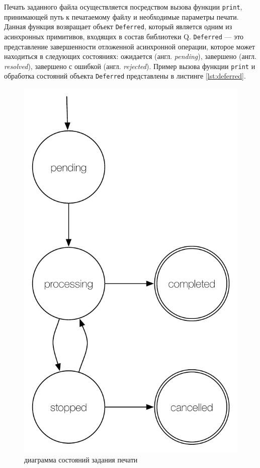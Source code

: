 \documentclass[a4paper,14pt,href,draft]{article}
\begin{document}
Печать заданного файла осуществляется посредством вызова функции \texttt{print}, принимающей путь к печатаемому файлу и
необходимые параметры печати. Данная функция возвращает объект \texttt{Deferred}, который является одним из асинхронных
примитивов, входящих в состав библиотеки Q\cite{QLibrary}. \texttt{Deferred} --- это представление завершенности отложенной
асинхронной операции, которое может находиться в следующих состояниях: ожидается (англ. \textit{pending}),
завершено (англ. \textit{resolved}), завершено с ошибкой (англ. \textit{rejected}). Пример вызова функции \texttt{print}
и обработка состояний объекта \texttt{Deferred} представлены в листинге \ref{lst:deferred}.

\begin{figure}[htbp]
\begin{center}
  \includegraphics[scale=0.65]{state-machine.pdf}
    \caption{диаграмма состояний задания печати}
    \label{fig:StateMachine}
\end{center}
\end{figure}
\end{document}
